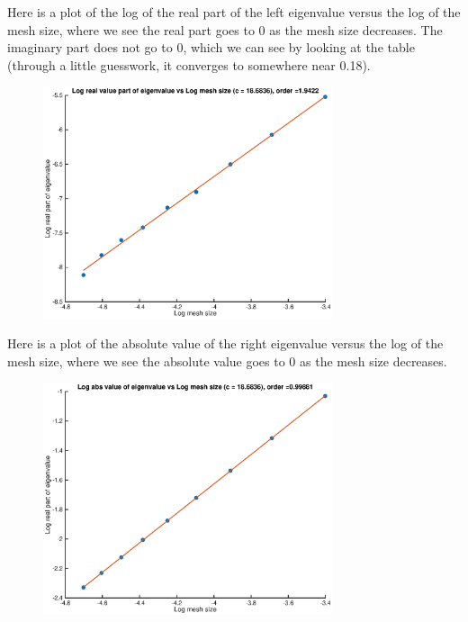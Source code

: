 \documentclass[12pt]{article}
\begin{document}
Here is a plot of the log of the real part of the left eigenvalue versus the log of the mesh size, where we see the real part goes to 0 as the mesh size decreases. The imaginary part does not go to 0, which we can see by looking at the table (through a little guesswork, it converges to somewhere near 0.18).
\begin{figure}[H]
\includegraphics[width=8.5cm]{2double2logplot1}
\end{figure}
Here is a plot of the absolute value of the right eigenvalue versus the log of the mesh size, where we see the absolute value goes to 0 as the mesh size decreases.
\begin{figure}[H]
\includegraphics[width=8.5cm]{2double2logplot2}
\end{figure}
\end{document}
